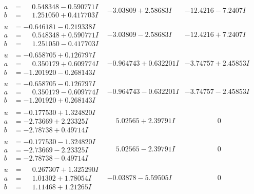 \documentclass[1p]{elsarticle_modified}
\theoremstyle{definition}
\begin{document}
$$\begin{array}{c|c|c}
\begin{aligned}
a &= \phantom{-}0.548348 - 0.590771 I \\
b &= \phantom{-}1.251050 + 0.417703 I\end{aligned}
 & -3.03809 + 2.58683 I & -12.4216 - 7.2407 I \\ \hline\begin{aligned}
u &= -0.646181 - 0.219338 I \\
a &= \phantom{-}0.548348 + 0.590771 I \\
b &= \phantom{-}1.251050 - 0.417703 I\end{aligned}
 & -3.03809 - 2.58683 I & -12.4216 + 7.2407 I \\ \hline\begin{aligned}
u &= -0.658705 + 0.126797 I \\
a &= \phantom{-}0.350179 + 0.609774 I \\
b &= -1.201920 - 0.268143 I\end{aligned}
 & -0.964743 + 0.632201 I & -3.74757 + 2.45853 I \\ \hline\begin{aligned}
u &= -0.658705 - 0.126797 I \\
a &= \phantom{-}0.350179 - 0.609774 I \\
b &= -1.201920 + 0.268143 I\end{aligned}
 & -0.964743 - 0.632201 I & -3.74757 - 2.45853 I \\ \hline\begin{aligned}
u &= -0.177530 + 1.324820 I \\
a &= -2.73669 + 2.23325 I \\
b &= -2.78738 + 0.49714 I\end{aligned}
 & \phantom{-}5.02565 + 2.39791 I & \phantom{-0.000000 } 0 \\ \hline\begin{aligned}
u &= -0.177530 - 1.324820 I \\
a &= -2.73669 - 2.23325 I \\
b &= -2.78738 - 0.49714 I\end{aligned}
 & \phantom{-}5.02565 - 2.39791 I & \phantom{-0.000000 } 0 \\ \hline\begin{aligned}
u &= \phantom{-}0.267307 + 1.325290 I \\
a &= \phantom{-}1.01302 + 1.78054 I \\
b &= \phantom{-}1.11468 + 1.21265 I\end{aligned}
 & -0.03878 - 5.59505 I & \phantom{-0.000000 } 0 \\ \hline\begin{aligned}

\end{aligned}
\end{array}$$
\end{document}
